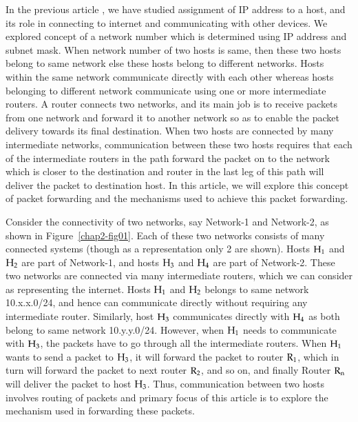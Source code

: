 \begin{multicols}{2}

In the previous article \cite{art2-key01}, we have studied assignment of IP address \cite{art2-key02} to a host, and its role in connecting to internet and communicating with other devices. We explored concept of a network number which is determined using IP address and subnet mask. When network number of two hosts is same, then these two hosts belong to same network else these hosts belong to different networks. Hosts within the same network communicate directly with each other whereas hosts belonging to different network communicate using one or more intermediate routers. A router connects two networks, and its main job is to receive packets from one network and forward it to another network so as to enable the packet delivery towards its final destination. When two hosts are connected by many intermediate networks, communication between these two hosts requires that each of the intermediate routers in the path forward the packet on to the network which is closer to the destination and router in the last leg of this path will deliver the packet to destination host. In this article, we will explore this concept of packet forwarding and the mechanisms used to achieve this packet forwarding.

Consider the connectivity of two networks, say Network-1 and Network-2, as shown in Figure~\ref{chap2-fig01}. Each of these two networks consists of many connected systems (though as a representation only 2 are shown). Hosts ${\rm H}_1$ and ${\rm H}_2$ are part of Network-1, and hosts ${\rm H}_3$ and ${\rm H}_4$ are part of Network-2. These two networks are connected via many intermediate routers, which we can consider as representing the internet. Hosts ${\rm H}_1$ and ${\rm H}_2$ belongs to same network 10.x.x.0/24, and hence can communicate directly without requiring any intermediate router. Similarly, host ${\rm H}_3$ communicates directly with ${\rm H}_4$ as both belong to same network 10.y.y.0/24. However, when ${\rm H}_1$ needs to communicate with ${\rm H}_3$, the packets have to go through all the intermediate routers. When ${\rm H}_1$ wants to send a packet to ${\rm H}_3$, it will forward the packet to router ${\rm R}_1$, which in turn will forward the packet to next router ${\rm R}_2$, and so on, and finally Router ${\rm R}_{\rm n}$ will deliver the packet to host ${\rm H}_3$. Thus, communication between two hosts involves routing of packets and primary focus of this article is to explore the mechanism used in forwarding these packets.
\end{multicols}

